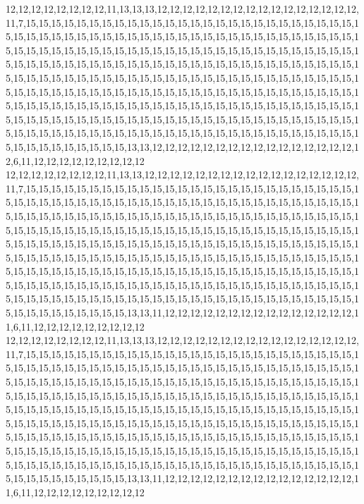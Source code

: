 12,12,12,12,12,12,12,12,11,13,13,13,12,12,12,12,12,12,12,12,12,12,12,12,12,12,12,12,11,7,15,15,15,15,15,15,15,15,15,15,15,15,15,15,15,15,15,15,15,15,15,15,15,15,15,15,15,15,15,15,15,15,15,15,15,15,15,15,15,15,15,15,15,15,15,15,15,15,15,15,15,15,15,15,15,15,15,15,15,15,15,15,15,15,15,15,15,15,15,15,15,15,15,15,15,15,15,15,15,15,15,15,15,15,15,15,15,15,15,15,15,15,15,15,15,15,15,15,15,15,15,15,15,15,15,15,15,15,15,15,15,15,15,15,15,15,15,15,15,15,15,15,15,15,15,15,15,15,15,15,15,15,15,15,15,15,15,15,15,15,15,15,15,15,15,15,15,15,15,15,15,15,15,15,15,15,15,15,15,15,15,15,15,15,15,15,15,15,15,15,15,15,15,15,15,15,15,15,15,15,15,15,15,15,15,15,15,15,15,15,15,15,15,15,15,15,15,15,15,15,15,15,15,15,15,15,15,15,15,15,15,15,15,15,15,15,15,15,15,15,15,15,15,15,15,15,15,15,15,15,15,15,15,15,15,15,15,15,15,15,15,15,15,15,15,15,15,15,15,15,15,15,15,15,15,15,15,15,15,15,13,13,12,12,12,12,12,12,12,12,12,12,12,12,12,12,12,12,12,6,11,12,12,12,12,12,12,12,12,12
12,12,12,12,12,12,12,12,11,13,13,12,12,12,12,12,12,12,12,12,12,12,12,12,12,12,12,12,11,7,15,15,15,15,15,15,15,15,15,15,15,15,15,15,15,15,15,15,15,15,15,15,15,15,15,15,15,15,15,15,15,15,15,15,15,15,15,15,15,15,15,15,15,15,15,15,15,15,15,15,15,15,15,15,15,15,15,15,15,15,15,15,15,15,15,15,15,15,15,15,15,15,15,15,15,15,15,15,15,15,15,15,15,15,15,15,15,15,15,15,15,15,15,15,15,15,15,15,15,15,15,15,15,15,15,15,15,15,15,15,15,15,15,15,15,15,15,15,15,15,15,15,15,15,15,15,15,15,15,15,15,15,15,15,15,15,15,15,15,15,15,15,15,15,15,15,15,15,15,15,15,15,15,15,15,15,15,15,15,15,15,15,15,15,15,15,15,15,15,15,15,15,15,15,15,15,15,15,15,15,15,15,15,15,15,15,15,15,15,15,15,15,15,15,15,15,15,15,15,15,15,15,15,15,15,15,15,15,15,15,15,15,15,15,15,15,15,15,15,15,15,15,15,15,15,15,15,15,15,15,15,15,15,15,15,15,15,15,15,15,15,15,15,15,15,15,15,15,15,15,15,15,15,15,15,15,15,15,15,15,13,13,11,12,12,12,12,12,12,12,12,12,12,12,12,12,12,12,11,6,11,12,12,12,12,12,12,12,12,12
12,12,12,12,12,12,12,12,11,13,13,13,12,12,12,12,12,12,12,12,12,12,12,12,12,12,12,12,11,7,15,15,15,15,15,15,15,15,15,15,15,15,15,15,15,15,15,15,15,15,15,15,15,15,15,15,15,15,15,15,15,15,15,15,15,15,15,15,15,15,15,15,15,15,15,15,15,15,15,15,15,15,15,15,15,15,15,15,15,15,15,15,15,15,15,15,15,15,15,15,15,15,15,15,15,15,15,15,15,15,15,15,15,15,15,15,15,15,15,15,15,15,15,15,15,15,15,15,15,15,15,15,15,15,15,15,15,15,15,15,15,15,15,15,15,15,15,15,15,15,15,15,15,15,15,15,15,15,15,15,15,15,15,15,15,15,15,15,15,15,15,15,15,15,15,15,15,15,15,15,15,15,15,15,15,15,15,15,15,15,15,15,15,15,15,15,15,15,15,15,15,15,15,15,15,15,15,15,15,15,15,15,15,15,15,15,15,15,15,15,15,15,15,15,15,15,15,15,15,15,15,15,15,15,15,15,15,15,15,15,15,15,15,15,15,15,15,15,15,15,15,15,15,15,15,15,15,15,15,15,15,15,15,15,15,15,15,15,15,15,15,15,15,15,15,15,15,15,15,15,15,15,15,15,15,15,15,15,15,15,13,13,11,12,12,12,12,12,12,12,12,12,12,12,12,12,12,12,11,6,11,12,12,12,12,12,12,12,12,12
